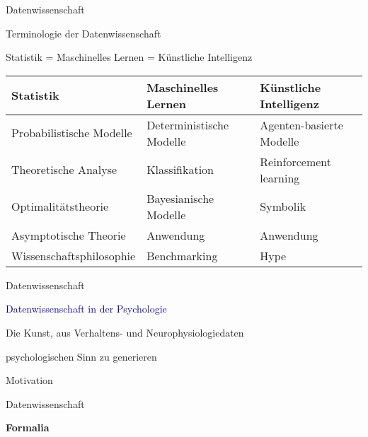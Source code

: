 \documentclass[
  8pt,
  ignorenonframetext,
]{beamer}
\begin{document}
\begin{frame}{Datenwissenschaft}
\protect\hypertarget{datenwissenschaft-5}{}
\Large

Terminologie der Datenwissenschaft \vspace{.5cm}

\center

Statistik = Maschinelles Lernen = Künstliche Intelligenz \vspace{.5cm}

\small
\renewcommand{\arraystretch}{1.5}
\begin{tabular}{l|l|l}

Statistik                           & Maschinelles Lernen           & Künstliche Intelligenz        \\\hline
Probabilistische Modelle    & Deterministische Modelle  & Agenten-basierte Modelle  \\
Theoretische Analyse          & Klassifikation                & Reinforcement learning      \\
Optimalitätstheorie           & Bayesianische Modelle         & Symbolik                              \\
Asymptotische Theorie         & Anwendung                           & Anwendung                           \\
Wissenschaftsphilosophie    & Benchmarking                    & Hype                                    \\
\end{tabular}
\end{frame}

\begin{frame}{Datenwissenschaft}
\protect\hypertarget{datenwissenschaft-6}{}
\vfill

\center
\huge

\textcolor{darkblue}{Datenwissenschaft in der Psychologie} \vspace{5mm}

\Large

Die Kunst, aus Verhaltens- und Neurophysiologiedaten

psychologischen Sinn zu generieren
\end{frame}

\begin{frame}{}
\protect\hypertarget{section-8}{}
\vfill
\Large

Motivation

Datenwissenschaft

\textbf{Formalia} \vfill
\end{frame}
\end{document}
